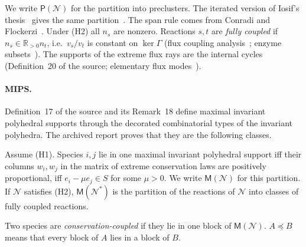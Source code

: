 \documentclass[11pt,a4paper]{report}
\newcommand{\Net}{\mathcal{N}}
\newcommand{\Nd}{\mathcal{N}^{*}}
\newcommand{\Pre}{\mathsf{P}}
\newcommand{\Mips}{\mathsf{M}}
\newcommand{\refi}{\preceq}
\newcommand{\Rp}{\mathbb{R}_{>0}}
\begin{document}
We write \(\Pre(\Net)\) for the partition into preclusters. The iterated version of Iosif's
thesis~\autocite[Def.~4.3, Alg.~4.4]{Iosif2019} gives the same partition~\autocite[Lemma~5]{ArchivedReport}. The span
rule comes from Conradi and Flockerzi~\autocite[Fact~2]{ConradiFlockerzi2012}. Under (H2) all \(n_s\) are nonzero.
Reactions \(s,t\) are \emph{fully coupled} if \(n_s\in\Rp n_t\), i.e.\ \(v_s/v_t\) is constant on \(\ker\Gamma\)
(flux coupling analysis~\autocite{Burgard2004}; enzyme subsets~\autocite{Pfeiffer1999}). The supports of the extreme flux rays
are the internal cycles (Definition~20 of the source; elementary flux modes~\autocite{SchusterHilgetag1994}).

\paragraph{MIPS.} Definition~17 of the source and its Remark~18 define maximal invariant polyhedral supports through
the decorated combinatorial types of the invariant polyhedra. The archived report proves that they are the following
classes.

\begin{proposition}\label{prop:mips}
Assume (H1). Species \(i,j\) lie in one maximal invariant polyhedral support iff their columns \(w_i,w_j\) in the
matrix of extreme conservation laws are positively proportional, iff \(e_i-\mu e_j\in S\) for some \(\mu>0\). We
write \(\Mips(\Net)\) for this partition. If \(\Net\) satisfies (H2), \(\Mips(\Nd)\) is the partition of the
reactions of \(\Net\) into classes of fully coupled reactions.
\end{proposition}

Two species are \emph{conservation-coupled} if they lie in one block of \(\Mips(\Net)\). \(A\refi B\) means that every
block of \(A\) lies in a block of \(B\).
\end{document}
